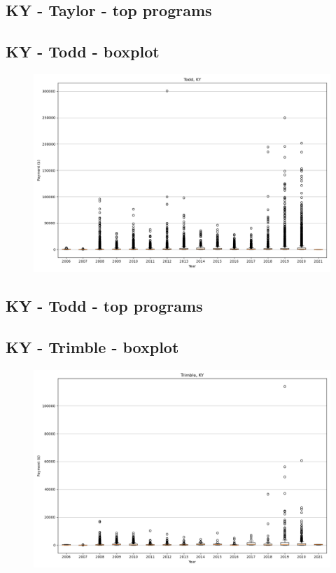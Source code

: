\subsection*{KY - Taylor - top programs}

\newpage
\subsection*{KY - Todd - boxplot}
\begin{figure}[h]
\centering
\includegraphics[width=7in]{../output/boxplots/counties/Todd-KY_boxplot.png}
\end{figure}


\subsection*{KY - Todd - top programs}

\newpage
\subsection*{KY - Trimble - boxplot}
\begin{figure}[h]
\centering
\includegraphics[width=7in]{../output/boxplots/counties/Trimble-KY_boxplot.png}
\end{figure}


